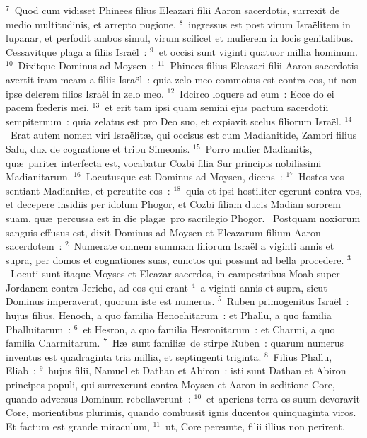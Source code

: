 ${}^{7}$~Quod cum vidisset Phinees filius Eleazari filii Aaron sacerdotis, surrexit de medio multitudinis, et arrepto pugione,
${}^{8}$~ingressus est post virum Isra\"elitem in lupanar, et perfodit ambos simul, virum scilicet et mulierem in locis genitalibus. Cessavitque plaga a filiis Isra\"el~:
${}^{9}$~et occisi sunt viginti quatuor millia hominum.
${}^{10}$~Dixitque Dominus ad Moysen~:
${}^{11}$~Phinees filius Eleazari filii Aaron sacerdotis avertit iram meam a filiis Isra\"el~: quia zelo meo commotus est contra eos, ut non ipse delerem filios Isra\"el in zelo meo.
${}^{12}$~Idcirco loquere ad eum~: Ecce do ei pacem fœderis mei,
${}^{13}$~et erit tam ipsi quam semini ejus pactum sacerdotii sempiternum~: quia zelatus est pro Deo suo, et expiavit scelus filiorum Isra\"el.
${}^{14}$~Erat autem nomen viri Isra\"elit\ae , qui occisus est cum Madianitide, Zambri filius Salu, dux de cognatione et tribu Simeonis.
${}^{15}$~Porro mulier Madianitis, qu\ae\ pariter interfecta est, vocabatur Cozbi filia Sur principis nobilissimi Madianitarum.
${}^{16}$~Locutusque est Dominus ad Moysen, dicens~:
${}^{17}$~Hostes vos sentiant Madianit\ae , et percutite eos~:
${}^{18}$~quia et ipsi hostiliter egerunt contra vos, et decepere insidiis per idolum Phogor, et Cozbi filiam ducis Madian sororem suam, qu\ae\ percussa est in die plag\ae\ pro sacrilegio Phogor.
~Postquam noxiorum sanguis effusus est, dixit Dominus ad Moysen et Eleazarum filium Aaron sacerdotem~:
${}^{2}$~Numerate omnem summam filiorum Isra\"el a viginti annis et supra, per domos et cognationes suas, cunctos qui possunt ad bella procedere.
${}^{3}$~Locuti sunt itaque Moyses et Eleazar sacerdos, in campestribus Moab super Jordanem contra Jericho, ad eos qui erant
${}^{4}$~a viginti annis et supra, sicut Dominus imperaverat, quorum iste est numerus.
${}^{5}$~Ruben primogenitus Isra\"el~: hujus filius, Henoch, a quo familia Henochitarum~: et Phallu, a quo familia Phalluitarum~:
${}^{6}$~et Hesron, a quo familia Hesronitarum~: et Charmi, a quo familia Charmitarum.
${}^{7}$~H\ae\ sunt famili\ae\ de stirpe Ruben~: quarum numerus inventus est quadraginta tria millia, et septingenti triginta.
${}^{8}$~Filius Phallu, Eliab~:
${}^{9}$~hujus filii, Namuel et Dathan et Abiron~: isti sunt Dathan et Abiron principes populi, qui surrexerunt contra Moysen et Aaron in seditione Core, quando adversus Dominum rebellaverunt~:
${}^{10}$~et aperiens terra os suum devoravit Core, morientibus plurimis, quando combussit ignis ducentos quinquaginta viros. Et factum est grande miraculum,
${}^{11}$~ut, Core pereunte, filii illius non perirent.
